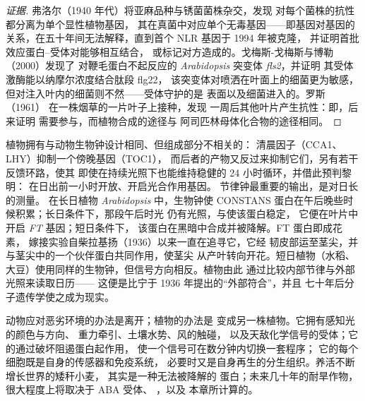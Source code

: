 \begin{proof}[证据]
弗洛尔（1940 年代）将亚麻品种与锈菌菌株杂交，发现
对每个菌株的抗性都分离为单个显性植物基因，
其在真菌中对应单个无毒基因——即基因对基因的
关系，在五十年间无法解释，直到首个 NLR 基因于 1994 年被克隆，
并证明首批效应蛋白–受体对能够相互结合，
或标记对方造成的。戈梅斯-戈梅斯与博勒（2000）发现了
对鞭毛蛋白不起反应的 \emph{Arabidopsis} 突变体 \emph{fls2}，并证明
其受体激酶能以纳摩尔浓度结合肽段 flg22，
该突变体对喷洒在叶面上的细菌更为敏感，
但对注入叶内的细菌则不然——受体守护的是
表面以及细菌进入的。罗斯（1961）
在一株烟草的一片叶子上接种，发现
一周后其他叶片产生抗性：即，后来证明
需要参与，而植物合成的途径与
阿司匹林母体化合物的途径相同。
\end{proof}

\begin{example}[植物的生物钟与日长]\label{ex:b3:plant-molecular-physiology:clock}
植物拥有与动物生物钟设计相同、但组成部分不相关的：
清晨因子（CCA1、LHY）抑制一个傍晚基因（TOC1），
而后者的产物又反过来抑制它们，另有若干反馈环路，使其
即使在持续光照下也能维持稳健的 24 小时循环，并借此预判黎明：
在日出前一小时开放、开启光合作用基因。
节律钟最重要的输出，是对日长的测量。
在长日植物 \emph{Arabidopsis} 中，生物钟使
CONSTANS 蛋白在午后晚些时候积累；长日条件下，那段午后时光
仍有光照，与使该蛋白稳定，
它便在叶片中开启 \emph{FT} 基因；短日条件下，
该蛋白在黑暗中合成并被降解。FT 蛋白即成花素，
嫁接实验自柴拉基扬（1936）以来一直在追寻它，它经
韧皮部运至茎尖，并与茎尖中的一个伙伴蛋白共同作用，使茎尖
从产叶转向开花。短日植物（水稻、
大豆）使用同样的生物钟，但信号方向相反。植物由此
通过比较内部节律与外部光照来读取日历——
这便是比宁于 1936 年提出的“外部符合”，并且
七十年后分子遗传学使之成为现实。
\end{example}

\begin{remark}\label{rem:b3:plant-molecular-physiology:remark}
动物应对恶劣环境的办法是离开；植物的办法是
变成另一株植物。它拥有感知光的颜色与方向、
重力牵引、土壤水势、风的触碰，
以及天敌化学信号的受体；它的通过破坏阻遏蛋白起作用，
使一个信号可在数分钟内切换一套程序；
它的每个细胞既是自身的传感器和免疫系统，
必要时又是自身再生的分生组织。养活不断增长世界的矮秆小麦，
其实是一种无法被降解的  蛋白；未来几十年的耐旱作物，
很大程度上将取决于 ABA 受体、
，以及
本章所计算的。
\end{remark}


